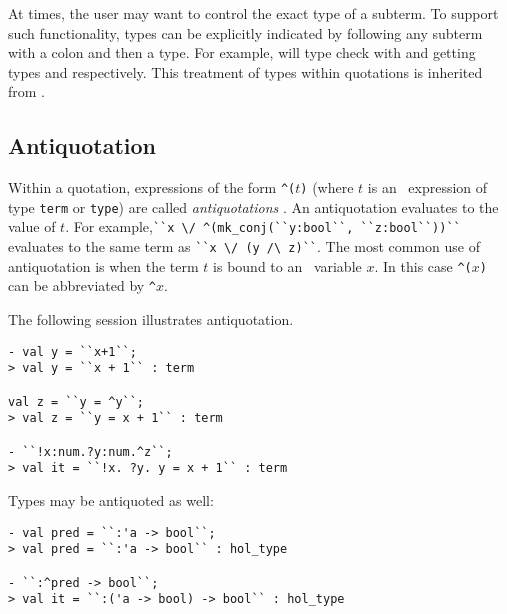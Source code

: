 At times, the user may want to control the exact type of a subterm. To
support such functionality, types can be explicitly indicated by
following any subterm with a colon and then a type.  For example,
 will type check with  and 
getting types  and  respectively.
This treatment of types within quotations is inherited from
\LCF.
%

\subsection{Antiquotation}

Within a quotation, expressions of the form {\small\verb+^(+}$t${\small\verb+)+}
%
%
(where $t$ is an \ML\ expression of type
%
%
{\small\verb+term+} or {\small\verb+type+}) are called {\it antiquotations\/}
%
.
%
An antiquotation  evaluates to the
\ML{} value of $t$. For example,{\small\verb+``x \/ ^(mk_conj(``y:bool``, ``z:bool``))``+}
evaluates to the same term as {\small\verb+``x \/ (y /\ z)``+}. The
most common use of antiquotation is when the term $t$ is bound to an \ML\
variable $x$. In this case {\small\verb+^(+}$x${\small\verb+)+} can be
abbreviated by {\small\verb+^+}$x$.

The following session illustrates antiquotation.

\setcounter{sessioncount}{1}
\begin{session}
\begin{verbatim}
- val y = ``x+1``;
> val y = ``x + 1`` : term

val z = ``y = ^y``;
> val z = ``y = x + 1`` : term

- ``!x:num.?y:num.^z``;
> val it = ``!x. ?y. y = x + 1`` : term
\end{verbatim}
\end{session}

\noindent Types may be antiquoted as well:

\setcounter{sessioncount}{1}
\begin{session}
\begin{verbatim}
- val pred = ``:'a -> bool``;
> val pred = ``:'a -> bool`` : hol_type

- ``:^pred -> bool``;
> val it = ``:('a -> bool) -> bool`` : hol_type
\end{verbatim}
\end{session}

